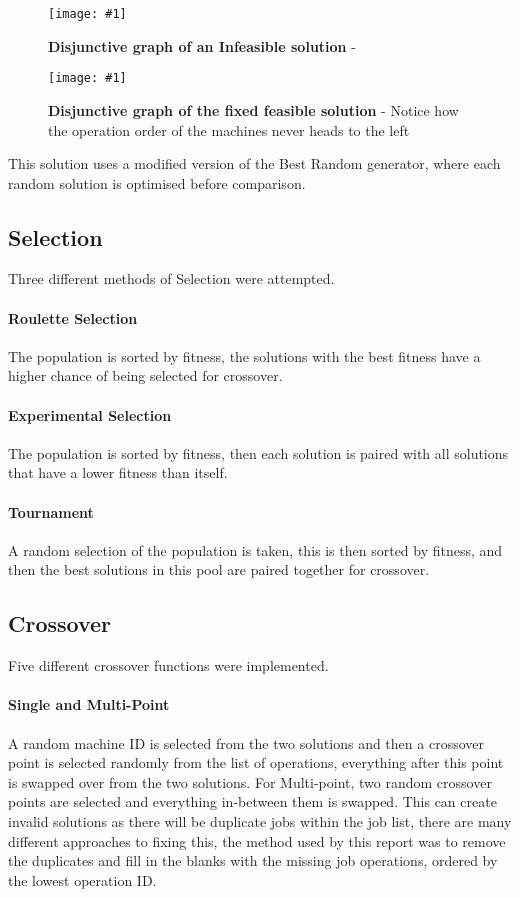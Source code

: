 \documentclass[14pt]{acmsiggraph}
\newcommand{\figuremacroW}[4]{
	\begin{figure}[h] %
		\centering
		\texttt{[image: \#1]}
		\caption[#2]{\textbf{#2} - #3}
		\label{fig:#1}
	\end{figure}
}
\begin{document}
	\figuremacroW
	{infeasible}
	{Disjunctive graph of an Infeasible solution}
	{\cite{wang2012new}}
	{1.0}
	\figuremacroW
	{good}
	{Disjunctive graph of the fixed feasible solution}
	{Notice how the operation order of the machines never heads to the left\cite{wang2012new}}
	{1.0}
	
	This solution uses a modified version of the Best Random generator, where each random solution is optimised before comparison.
	
	\subsection{Selection}
	Three different methods of Selection were attempted.
	
	\paragraph{Roulette Selection}
	The population is sorted by fitness, the solutions with the best fitness have a higher chance of being selected for crossover.
	
	\paragraph{Experimental Selection}
	The population is sorted by fitness, then each solution is paired with all solutions that have a lower fitness than itself.
	
	\paragraph{Tournament}
	A random selection of the population is taken, this is then sorted by fitness, and then the best solutions in this pool are paired together for crossover.
	
	\subsection{Crossover}
	Five different crossover functions were implemented.
	\paragraph{Single and Multi-Point}
	A random machine ID is selected from the two solutions and then a crossover point is selected randomly from the list of operations, everything after this point is swapped over from the two solutions. For Multi-point, two random crossover points are selected and everything in-between them is swapped. This can create invalid solutions as there will be duplicate jobs within the job list, there are many different approaches to fixing this, the method used by this report was to remove the duplicates and fill in the blanks with the missing job operations, ordered by the lowest operation ID.
	
\end{document}

